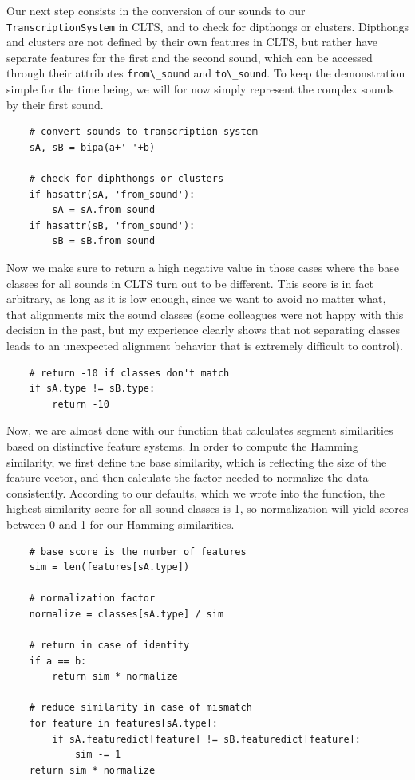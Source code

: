 \documentclass[
  a4paper,
  14pt,
  oneside,
  tablecaptionabove
]{scrbook}
\newcommand{\passthrough}[1]{#1}
\begin{document}
Our next step consists in the conversion of our sounds to our
\passthrough{\lstinline!TranscriptionSystem!} in CLTS, and to check for
dipthongs or clusters. Dipthongs and clusters are not defined by their
own features in CLTS, but rather have separate features for the first
and the second sound, which can be accessed through their attributes
\passthrough{\lstinline!from\_sound!} and
\passthrough{\lstinline!to\_sound!}. To keep the demonstration simple
for the time being, we will for now simply represent the complex sounds
by their first sound.

\begin{lstlisting}
    # convert sounds to transcription system
    sA, sB = bipa(a+' '+b)

    # check for diphthongs or clusters
    if hasattr(sA, 'from_sound'):
        sA = sA.from_sound
    if hasattr(sB, 'from_sound'):
        sB = sB.from_sound
\end{lstlisting}

Now we make sure to return a high negative value in those cases where
the base classes for all sounds in CLTS turn out to be different. This
score is in fact arbitrary, as long as it is low enough, since we want
to avoid no matter what, that alignments mix the sound classes (some
colleagues were not happy with this decision in the past, but my
experience clearly shows that not separating classes leads to an
unexpected alignment behavior that is extremely difficult to control).

\begin{lstlisting}
    # return -10 if classes don't match
    if sA.type != sB.type:
        return -10
\end{lstlisting}

Now, we are almost done with our function that calculates segment
similarities based on distinctive feature systems. In order to compute
the Hamming similarity, we first define the base similarity, which is
reflecting the size of the feature vector, and then calculate the factor
needed to normalize the data consistently. According to our defaults,
which we wrote into the function, the highest similarity score for all
sound classes is 1, so normalization will yield scores between 0 and 1
for our Hamming similarities.

\begin{lstlisting}
    # base score is the number of features
    sim = len(features[sA.type])

    # normalization factor
    normalize = classes[sA.type] / sim

    # return in case of identity
    if a == b:
        return sim * normalize

    # reduce similarity in case of mismatch
    for feature in features[sA.type]:
        if sA.featuredict[feature] != sB.featuredict[feature]:
            sim -= 1
    return sim * normalize
\end{lstlisting}
\end{document}
